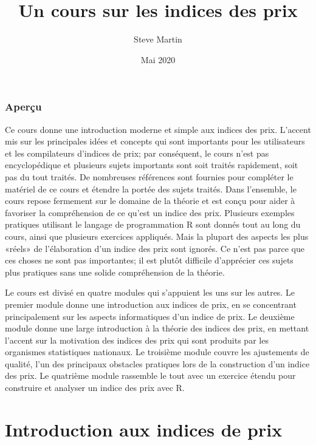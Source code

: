 \documentclass[]{article}
\title{Un cours sur les indices des prix}
\author{Steve Martin}
\date{Mai 2020}
\begin{document}
\maketitle

{
\setcounter{tocdepth}{2}
\tableofcontents
}
\hypertarget{aperuxe7u}{%
\section*{Aperçu}\label{aperuxe7u}}

Ce cours donne une introduction moderne et simple aux indices des prix. L'accent mis sur les principales idées et concepts qui sont importants pour les utilisateurs et les compilateurs d'indices de prix; par conséquent, le cours n'est pas encyclopédique et plusieurs sujets importants sont soit traités rapidement, soit pas du tout traités. De nombreuses références sont fournies pour compléter le matériel de ce cours et étendre la portée des sujets traités. Dans l'ensemble, le cours repose fermement sur le domaine de la théorie et est conçu pour aider à favoriser la compréhension de ce qu'est un indice des prix. Plusieurs exemples pratiques utilisant le langage de programmation R sont donnés tout au long du cours, ainsi que plusieurs exercices appliqués. Mais la plupart des aspects les plus «réels» de l'élaboration d'un indice des prix sont ignorés. Ce n'est pas parce que ces choses ne sont pas importantes; il est plutôt difficile d'apprécier ces sujets plus pratiques sans une solide compréhension de la théorie.

Le cours est divisé en quatre modules qui s'appuient les uns sur les autres. Le premier module donne une introduction aux indices de prix, en se concentrant principalement sur les aspects informatiques d'un indice de prix. Le deuxième module donne une large introduction à la théorie des indices des prix, en mettant l'accent sur la motivation des indices des prix qui sont produits par les organismes statistiques nationaux. Le troisième module couvre les ajustements de qualité, l'un des principaux obstacles pratiques lors de la construction d'un indice des prix. Le quatrième module rassemble le tout avec un exercice étendu pour construire et analyser un indice des prix avec R.

\hypertarget{part-introduction-aux-indices-de-prix}{%
\part{Introduction aux indices de prix}\label{part-introduction-aux-indices-de-prix}}
\end{document}
